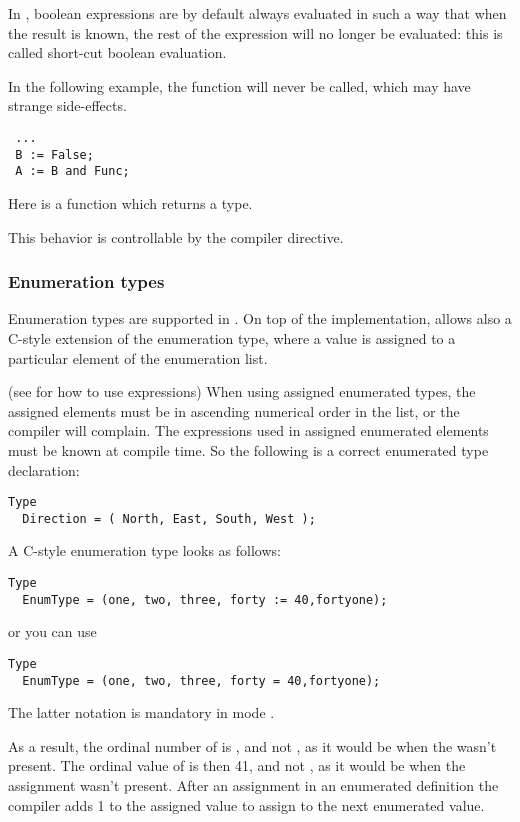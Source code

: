 \begin{remark}
In \fpc, boolean expressions are by default always evaluated in such a
way that when the result is known, the rest of the expression will no longer
be evaluated: this is called short-cut boolean evaluation.

In the following example, the function  will never be called,
which may have strange side-effects.
\begin{verbatim}
 ...
 B := False;
 A := B and Func;
\end{verbatim}
Here  is a function which returns a  type.

This behavior is controllable by the  compiler directive.
\end{remark}

\subsubsection{Enumeration types}
Enumeration types are supported in \fpc. On top of the \tp
implementation, \fpc allows also a C-style extension of the
enumeration type, where a value is assigned to a particular element of
the enumeration list.

(see  for how to use expressions)
When using assigned enumerated types, the assigned elements must be in
ascending numerical order in the list, or the compiler will complain.
The expressions used in assigned enumerated elements must be known at
compile time.
So the following is a correct enumerated type declaration:
\begin{verbatim}
Type
  Direction = ( North, East, South, West );
\end{verbatim}
A C-style enumeration type looks as follows:
\begin{verbatim}
Type
  EnumType = (one, two, three, forty := 40,fortyone);
\end{verbatim}
or you can use
\begin{verbatim}
Type
  EnumType = (one, two, three, forty = 40,fortyone);
\end{verbatim}
The latter notation is mandatory in mode .

As a result, the ordinal number of  is , and not ,
as it would be when the  wasn't present.
The ordinal value of  is then {41}, and not , as it
would be when the assignment wasn't present. After an assignment in an
enumerated definition the compiler adds 1 to the assigned value to assign to
the next enumerated value.

